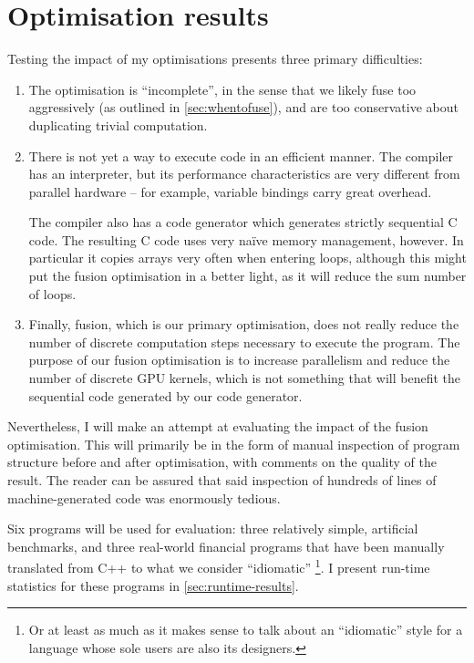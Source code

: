 \chapter{Optimisation results}
\label{chap:optimisation-results}

Testing the impact of my optimisations presents three primary
difficulties:

\begin{enumerate}
\item The optimisation is ``incomplete'', in the sense that we likely
  fuse too aggressively (as outlined in \cref{sec:whentofuse}), and
  are too conservative about duplicating trivial computation.

\item There is not yet a way to execute \LO{} code in an efficient
  manner.  The \LO{} compiler has an interpreter, but its performance
  characteristics are very different from parallel hardware -- for
  example, variable bindings carry great overhead.

  The compiler also has a code generator which generates strictly
  sequential C code.  The resulting C code uses very naïve memory
  management, however.  In particular it copies arrays very often when
  entering loops, although this might put the fusion optimisation in a
  better light, as it will reduce the sum number of loops.

\item Finally, fusion, which is our primary optimisation, does not
  really reduce the number of discrete computation steps necessary to
  execute the program.  The purpose of our fusion optimisation is to
  increase parallelism and reduce the number of discrete GPU kernels,
  which is not something that will benefit the sequential code
  generated by our code generator.
\end{enumerate}

Nevertheless, I will make an attempt at evaluating the impact of the
fusion optimisation.  This will primarily be in the form of manual
inspection of program structure before and after optimisation, with
comments on the quality of the result.  The reader can be assured that
said inspection of hundreds of lines of machine-generated code was
enormously tedious.

Six programs will be used for evaluation: three relatively simple,
artificial benchmarks, and three real-world financial programs that
have been manually translated from C++ to what we consider
``idiomatic'' \LO{}\footnote{Or at least as much as it makes sense to
  talk about an ``idiomatic'' style for a language whose sole users
  are also its designers.}.  I present run-time statistics for these
programs in \cref{sec:runtime-results}.


